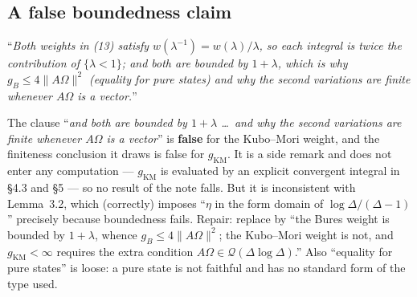 \documentclass[11pt]{article}
\begin{document}
\subsection{A false boundedness claim}\label{sec:bound}
\begin{issue}\label{iss:bound}
``\emph{Both weights in \textup{(13)} satisfy $w(\lambda^{-1})=w(\lambda)/\lambda$, so each integral is twice the
contribution of $\{\lambda<1\}$; and both are bounded by $1+\lambda$, which is why $g_B\le4\|A\Omega\|^2$
(equality for pure states) and why the second variations are finite whenever $A\Omega$ is a vector.}''
\end{issue}
\begin{verdictbreak}
The clause ``\emph{and both are bounded by $1+\lambda$ \dots\ and why the second variations are finite whenever
$A\Omega$ is a vector}'' is \textbf{false} for the Kubo--Mori weight, and the finiteness conclusion it draws is
false for $g_{\mathrm{KM}}$.  It is a side remark and does not enter any computation --- $g_{\mathrm{KM}}$ is
evaluated by an explicit convergent integral in \S4.3 and \S5 --- so no result of the note falls.  But it is
inconsistent with Lemma~3.2, which (correctly) imposes ``$\eta$ in the form domain of $\log\Delta/(\Delta-1)$''
precisely because boundedness fails.  Repair: replace by ``the Bures weight is bounded by $1+\lambda$, whence
$g_B\le4\|A\Omega\|^2$; the Kubo--Mori weight is not, and $g_{\mathrm{KM}}<\infty$ requires the extra condition
$A\Omega\in\mathcal Q(\Delta\log\Delta)$.''  Also ``equality for pure states'' is loose: a pure state is not
faithful and has no standard form of the type used.
\end{verdictbreak}
\end{document}
